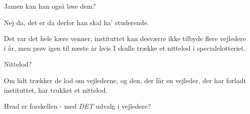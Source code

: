 \documentclass[a4paper,11pt]{article}
\begin{document}
\begin{sketch}
 Jamen kan han også løse dem?

 Nej da, det er da derfor han skal ha' studerende.

 Det var det hele kære venner, instituttet kan desværre ikke tilbyde flere vejledere i år, men prøv igen til næste år
         hvis I skulle trække et nittelod i specialelotteriet.

 Nittelod?

 Om lidt trækker de lod om vejlederne, og den, der får en vejleder, der har forladt instituttet, har trukket et nittelod.

 Hvad er forskellen - med \emph{DET} udvalg i vejledere?

\end{sketch}
\end{document}
